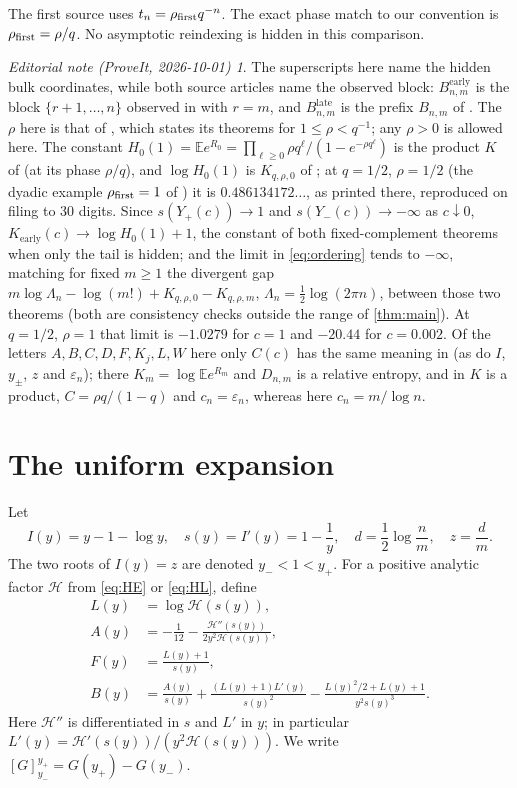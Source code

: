 \documentclass[11pt,oneside]{article}
\theoremstyle{remark}\newtheorem{remark}[theorem]{Remark}
\newtheorem*{ednote}{Editorial note (ProveIt, 2026-10-01)}
\newcommand{\E}{\mathbb E}
\newcommand{\eps}{\varepsilon}
\newcommand{\HH}{\mathcal H}
\numberwithin{equation}{section}
\begin{document}
The first source \cite{repo-early} uses $t_n=\rho_{\rm first}q^{-n}$.
The exact phase match to our convention is $\rho_{\rm first}=\rho/q$.
No asymptotic reindexing is hidden in this comparison.
\begin{ednote}
The superscripts here name the hidden bulk coordinates, while both source
articles name the observed block: $B^{\mathrm{early}}_{n,m}$ is the block
$\{r+1,\ldots,n\}$ observed in \cite{repo-early} with $r=m$, and
$B^{\mathrm{late}}_{n,m}$ is the prefix $B_{n,m}$ of \cite{repo-late}.
The $\rho$ here is that of \cite{repo-late}, which states its theorems
for $1\le\rho<q^{-1}$; any $\rho>0$ is allowed here. The constant
$H_0(1)=\E e^{R_0}=\prod_{\ell\ge0}\rho q^\ell/(1-e^{-\rho q^\ell})$ is
the product $K$ of \cite{repo-early} (at its phase $\rho/q$), and
$\log H_0(1)$ is $K_{q,\rho,0}$ of \cite{repo-late}; at $q=1/2$,
$\rho=1/2$ (the dyadic example $\rho_{\rm first}=1$ of \cite{repo-early})
it is $0.486134172\ldots$, as printed there, reproduced on filing to
30 digits. Since $s(Y_+(c))\to1$ and $s(Y_-(c))\to-\infty$ as
$c\downarrow0$, $K_{\mathrm{early}}(c)\to\log H_0(1)+1$, the constant of
both fixed-complement theorems when only the tail is hidden; and the
limit in \eqref{eq:ordering} tends to $-\infty$, matching for fixed
$m\ge1$ the divergent gap
$m\log\Lambda_n-\log(m!)+K_{q,\rho,0}-K_{q,\rho,m}$,
$\Lambda_n=\frac12\log(2\pi n)$, between those two theorems (both are
consistency checks outside the range of \cref{thm:main}). At $q=1/2$,
$\rho=1$ that limit is $-1.0279$ for $c=1$ and $-20.44$ for $c=0.002$.
Of the letters $A,B,C,D,F,K_j,L,W$ here only $C(c)$ has the same
meaning in \cite{repo-late} (as do $I$, $y_\pm$, $z$ and $\eps_n$); there $K_m=\log\E e^{R_m}$ and $D_{n,m}$ is a relative
entropy, and in \cite{repo-early} $K$ is a product, $C=\rho q/(1-q)$ and
$c_n=\eps_n$, whereas here $c_n=m/\log n$.
\end{ednote}

\section{The uniform expansion}
Let
\begin{equation}
 I(y)=y-1-\log y,\quad s(y)=I'(y)=1-\frac1y,\quad
 d=\frac12\log\frac nm,\quad z=\frac dm.
 \label{eq:rootsdata}
\end{equation}
The two roots of $I(y)=z$ are denoted $y_-<1<y_+$.
For a positive analytic factor $\HH$ from \eqref{eq:HE} or \eqref{eq:HL},
define
\begin{align}
 L(y)&=\log\HH(s(y)),\label{eq:L}\\
 A(y)&=-\frac1{12}-\frac{\HH''(s(y))}{2y^2\HH(s(y))},\label{eq:A}\\
 F(y)&=\frac{L(y)+1}{s(y)},\label{eq:F}\\
 B(y)&=\frac{A(y)}{s(y)}+
       \frac{(L(y)+1)L'(y)}{s(y)^2}
       -\frac{L(y)^2/2+L(y)+1}{y^2s(y)^3}.
 \label{eq:B}
\end{align}
Here $\HH''$ is differentiated in $s$ and $L'$ in $y$;
in particular $L'(y)=\HH'(s(y))/(y^2\HH(s(y)))$.
We write $[G]_{y_-}^{y_+}=G(y_+)-G(y_-)$.
\end{document}
